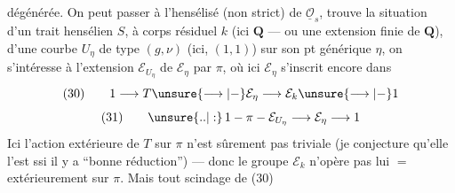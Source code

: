 dégénérée. On peut passer  à
l'hensélisé (non strict) de $\underline{\mathcal O}_s$, 
trouve la situation d'un trait hensélien
$S$, à corps résiduel $k$ (ici $\mathbf Q$ --- ou une
extension finie de $\mathbf Q$), d'une
courbe $U_\eta$ de type $(g,\nu)$ (ici, $(1,1)$)
sur son pt générique $\eta$, on s'intéresse
à l'extension $\mathcal E_{U_\eta}$ de $\mathcal E_\eta$ par $\pi$,
où ici $\mathcal E_\eta$ s'inscrit encore dans
\[
(30)\qquad 1\longrightarrow T\unsure{\longrightarrow|-}\mathcal E_\eta\longrightarrow\mathcal E_k\unsure{\longrightarrow|-}1
\]
\[
(31)\qquad \unsure{..|:}\,1-\pi-\mathcal E_{U_\eta}\longrightarrow\mathcal E_\eta\longrightarrow1
\]
Ici l'action extérieure de $T$ sur
$\pi$ n'est  sûrement pas triviale (je
conjecture qu'elle l'est ssi il y
a ``bonne réduction'') --- donc le groupe
$\mathcal E_k$ n'opère pas lui $=$ extérieurement
sur $\pi$. Mais tout scindage de (30)

